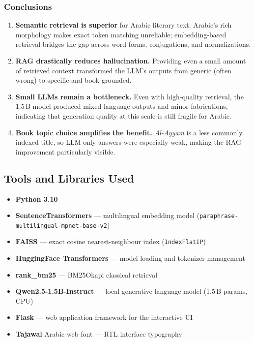 \subsubsection{Conclusions}

\begin{enumerate}
  \item \textbf{Semantic retrieval is superior} for Arabic literary text.
        Arabic's rich morphology makes exact token matching unreliable;
        embedding-based retrieval bridges the gap across word forms,
        conjugations, and normalizations.

  \item \textbf{RAG drastically reduces hallucination.}  Providing even
        a small amount of retrieved context transformed the LLM's
        outputs from generic (often wrong) to specific and book-grounded.

  \item \textbf{Small LLMs remain a bottleneck.}  Even with high-quality
        retrieval, the 1.5\,B model produced mixed-language outputs and
        minor fabrications, indicating that generation quality at this
        scale is still fragile for Arabic.

  \item \textbf{Book topic choice amplifies the benefit.}
        \textit{Al-Ayyam} is a less commonly indexed title, so LLM-only
        answers were especially weak, making the RAG improvement
        particularly visible.
\end{enumerate}

\subsection{Tools and Libraries Used}

\begin{itemize}
  \item \textbf{Python 3.10}
  \item \textbf{SentenceTransformers} --- multilingual embedding model
        (\texttt{paraphrase-multilingual-mpnet-base-v2})
  \item \textbf{FAISS} --- exact cosine nearest-neighbour index
        (\texttt{IndexFlatIP})
  \item \textbf{HuggingFace Transformers} --- model loading and
        tokenizer management
  \item \textbf{rank\_bm25} --- BM25Okapi classical retrieval
  \item \textbf{Qwen2.5-1.5B-Instruct} --- local generative language
        model (1.5\,B params, CPU)
  \item \textbf{Flask} --- web application framework for the interactive UI
  \item \textbf{Tajawal} Arabic web font --- RTL interface typography
\end{itemize}

\endgroup

